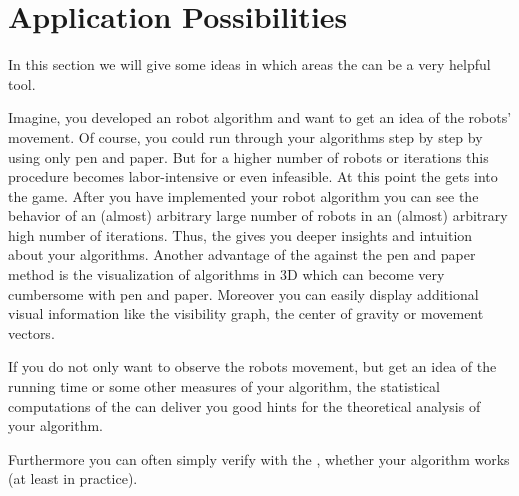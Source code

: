 \section{Application Possibilities}\label{WII:sec:application}
In this section we will give some ideas in which areas the \RSS can be a very helpful tool.\par
Imagine, you developed an robot algorithm and want to get an idea of the robots' movement.
Of course, you could run through your algorithms step by step by using only pen and paper. But for a higher number of robots or iterations this procedure becomes labor-intensive or even infeasible. At this point the \RSS gets into the game. After you have implemented your robot algorithm you can see the behavior of an (almost) arbitrary large number of robots in an (almost) arbitrary high number of iterations. Thus, the \RSS gives you deeper insights and intuition about your algorithms.
Another advantage of the \RSS against the pen and paper method is the visualization of algorithms in 3D which can become very cumbersome with pen and paper. Moreover you can easily display additional visual information like the visibility graph, the center of gravity or movement vectors.\par
If you do not only want to observe the robots movement, but get an idea of the running time or some other measures of your algorithm, the statistical computations of the \RSS can deliver you good hints for the theoretical analysis of your algorithm.\par
Furthermore you can often simply verify with the \RSS, whether your algorithm works (at least in practice).

